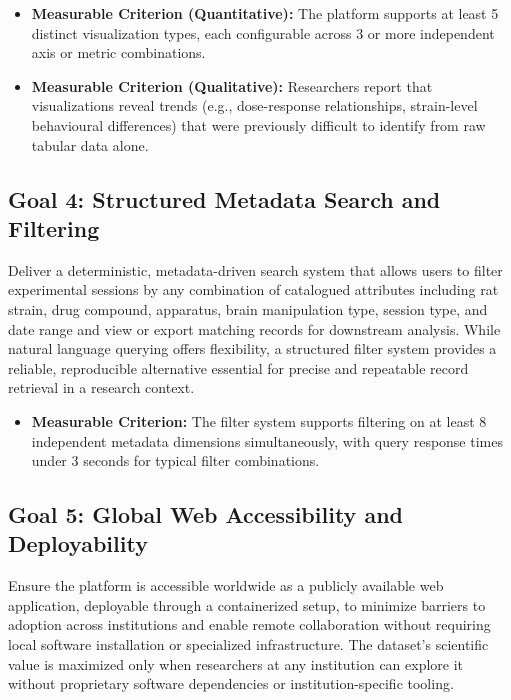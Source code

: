 \documentclass{article}
\begin{document}
  \begin{itemize}
    \item \textbf{Measurable Criterion (Quantitative):} The platform supports at least 5 distinct visualization
    types, each configurable across 3 or more independent axis or metric combinations.
    \item \textbf{Measurable Criterion (Qualitative):} Researchers report that visualizations reveal trends
    (e.g., dose-response relationships, strain-level behavioural differences) that were previously difficult to
    identify from raw tabular data alone.
  \end{itemize}

  \subsection{Goal 4: Structured Metadata Search and Filtering}
  
  \par{Deliver a deterministic, metadata-driven search system that allows users to filter experimental sessions
  by any combination of catalogued attributes including rat strain, drug compound, apparatus, brain
  manipulation type, session type, and date range and view or export matching records for downstream
  analysis. While natural language querying offers flexibility, a structured filter system provides a reliable,
  reproducible alternative essential for precise and repeatable record retrieval in a research context.}
  
  \begin{itemize}
    \item \textbf{Measurable Criterion:} The filter system supports filtering on at least 8
    independent metadata dimensions simultaneously, with query response times under 3 seconds for typical
    filter combinations.
  \end{itemize}

  \subsection{Goal 5: Global Web Accessibility and Deployability}
  
  \par{Ensure the platform is accessible worldwide as a publicly available web application, deployable through
  a containerized setup, to minimize barriers to adoption across institutions and enable remote collaboration
  without requiring local software installation or specialized infrastructure. The dataset's scientific value is
  maximized only when researchers at any institution can explore it without proprietary software dependencies or
  institution-specific tooling.}
  
\end{document}
